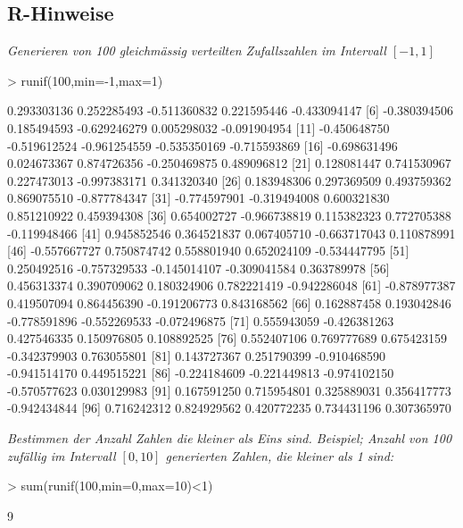 \subsection*{R-Hinweise}
\emph{Generieren von 100 gleichmässig verteilten Zufallszahlen im Intervall
$[-1,1]$}
\begin{Schunk}
\begin{Sinput}
> runif(100,min=-1,max=1)
\end{Sinput}
\begin{Soutput}
  [1]  0.293303136  0.252285493 -0.511360832  0.221595446 -0.433094147
  [6] -0.380394506  0.185494593 -0.629246279  0.005298032 -0.091904954
 [11] -0.450648750 -0.519612524 -0.961254559 -0.535350169 -0.715593869
 [16] -0.698631496  0.024673367  0.874726356 -0.250469875  0.489096812
 [21]  0.128081447  0.741530967  0.227473013 -0.997383171  0.341320340
 [26]  0.183948306  0.297369509  0.493759362  0.869075510 -0.877784347
 [31] -0.774597901 -0.319494008  0.600321830  0.851210922  0.459394308
 [36]  0.654002727 -0.966738819  0.115382323  0.772705388 -0.119948466
 [41]  0.945852546  0.364521837  0.067405710 -0.663717043  0.110878991
 [46] -0.557667727  0.750874742  0.558801940  0.652024109 -0.534447795
 [51]  0.250492516 -0.757329533 -0.145014107 -0.309041584  0.363789978
 [56]  0.456313374  0.390709062  0.180324906  0.782221419 -0.942286048
 [61] -0.878977387  0.419507094  0.864456390 -0.191206773  0.843168562
 [66]  0.162887458  0.193042846 -0.778591896 -0.552269533 -0.072496875
 [71]  0.555943059 -0.426381263  0.427546335  0.150976805  0.108892525
 [76]  0.552407106  0.769777689  0.675423159 -0.342379903  0.763055801
 [81]  0.143727367  0.251790399 -0.910468590 -0.941514170  0.449515221
 [86] -0.224184609 -0.221449813 -0.974102150 -0.570577623  0.030129983
 [91]  0.167591250  0.715954801  0.325889031  0.356417773 -0.942434844
 [96]  0.716242312  0.824929562  0.420772235  0.734431196  0.307365970
\end{Soutput}
\end{Schunk}
\emph{Bestimmen der Anzahl Zahlen die kleiner als Eins sind. Beispiel;
Anzahl von 100 zufällig im Intervall $[0,10]$ generierten Zahlen, die kleiner
als 1 sind:}
\begin{Schunk}
\begin{Sinput}
> sum(runif(100,min=0,max=10)<1)
\end{Sinput}
\begin{Soutput}
[1] 9
\end{Soutput}
\end{Schunk}

